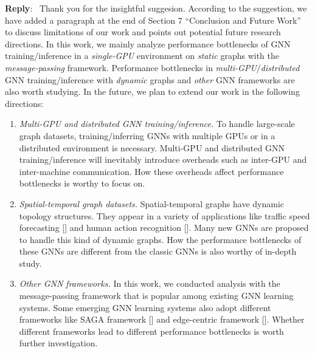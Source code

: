 \documentclass[12pt]{article}
\newcounter{reviewer}
\newcounter{point}[reviewer]
\newenvironment{reply}
   {\medskip \noindent \textbf{Reply}:\  }
   {\medskip}
\begin{document}
\begin{reply}
    Thank you for the insightful suggesion.
    According to the suggestion, we have added a paragraph at the end of Section 7 ``Conclusion and Future Work'' to discuss limitations of our work and points out potential future research directions.
    In this work, we mainly analyze performance bottlenecks of GNN training/inference in a \emph{single-GPU} environment on \emph{static} graphs with the \emph{message-passing} framework.
    Performance bottlenecks in \emph{multi-GPU}/\emph{distributed} GNN training/inference with \emph{dynamic} graphs and \emph{other} GNN frameworks are also worth studying.
    In the future, we plan to extend our work in the following directions:
\begin{enumerate}
    \item \emph{Multi-GPU and distributed GNN training/inference.}
    To handle large-scale graph datasets, training/inferring GNNs with multiple GPUs or in a distributed environment is necessary.
    Multi-GPU and distributed GNN training/inference will inevitably introduce overheads such as inter-GPU and inter-machine communication. 
    How these overheads affect performance bottlenecks is worthy to focus on.
    \item \emph{Spatial-temporal graph datasets.}
    Spatial-temporal graphs have dynamic topology structures.
    They appear in a variety of applications like traffic speed forecasting [\cite{li2018_DCRNN}] and human action recognition [\cite{yan2018_STGCN}].
    Many new GNNs are proposed to handle this kind of dynamic graphs.
    How the performance bottlenecks of these GNNs are different from the classic GNNs is also worthy of in-depth study.
    \item \emph{Other GNN frameworks.}
    In this work, we conducted analysis with the message-passing framework that is popular among existing GNN learning systems.
    Some emerging GNN learning systems also adopt different frameworks like SAGA framework [\cite{ma2019_neugraph}] and edge-centric framework [\cite{he2019_EnGN}].
    Whether different frameworks lead to different performance bottlenecks is worth further investigation.
\end{enumerate}

\end{reply}



\end{document}
